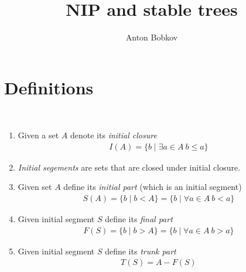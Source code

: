 \documentclass{amsart}
\begin{document}
\title{NIP and stable trees}
\author{Anton Bobkov}

\maketitle

\section{Definitions}

\begin{Definition}\ 
	\begin{enumerate}
		\item Given a set $A$ denote its \emph{initial closure} 
		\begin{align*}
			I(A) = \{b \mid \exists a \in A \ b \leq a\}
		\end{align*}
		\item \emph{Initial segements} are sets that are closed under initial closure.
		\item Given set $A$ define its \emph{initial part} (which is an initial segment)
		\begin{align*}
			S(A) = \{b \mid b < A\} = \{b \mid \forall a \in A \ b < a\}
		\end{align*}
		\item Given initial segment $S$ define its \emph{final part}
		\begin{align*}
			F(S) = \{b \mid b > A\} = \{b \mid \forall a \in A \ b > a\}
		\end{align*}
		\item Given initial segment $S$ define its \emph{trunk part}
		\begin{align*}
			T(S) = A - F(S)
		\end{align*}
	\end{enumerate}
\end{Definition}
\end{document}
